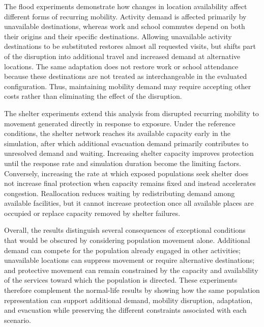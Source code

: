 The flood experiments demonstrate how changes in location availability affect different forms of recurring mobility. Activity demand is affected primarily by unavailable destinations, whereas work and school commutes depend on both their origins and their specific destinations. Allowing unavailable activity destinations to be substituted restores almost all requested visits, but shifts part of the disruption into additional travel and increased demand at alternative locations. The same adaptation does not restore work or school attendance because these destinations are not treated as interchangeable in the evaluated configuration. Thus, maintaining mobility demand may require accepting other costs rather than eliminating the effect of the disruption.

The shelter experiments extend this analysis from disrupted recurring mobility to movement generated directly in response to exposure. Under the reference conditions, the shelter network reaches its available capacity early in the simulation, after which additional evacuation demand primarily contributes to unresolved demand and waiting. Increasing shelter capacity improves protection until the response rate and simulation duration become the limiting factors. Conversely, increasing the rate at which exposed populations seek shelter does not increase final protection when capacity remains fixed and instead accelerates congestion. Reallocation reduces waiting by redistributing demand among available facilities, but it cannot increase protection once all available places are occupied or replace capacity removed by shelter failures.

Overall, the results distinguish several consequences of exceptional conditions that would be obscured by considering population movement alone. Additional demand can compete for the population already engaged in other activities; unavailable locations can suppress movement or require alternative destinations; and protective movement can remain constrained by the capacity and availability of the services toward which the population is directed. These experiments therefore complement the normal-life results by showing how the same population representation can support additional demand, mobility disruption, adaptation, and evacuation while preserving the different constraints associated with each scenario.